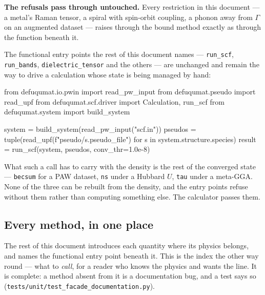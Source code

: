 \documentclass[11pt,a4paper]{article}
\newcommand{\code}[1]{\texttt{\small #1}}
\begin{document}
\textbf{The refusals pass through untouched.} Every restriction in this document
--- a metal's Raman tensor, a spiral with spin-orbit coupling, a phonon away from
$\Gamma$ on an augmented dataset --- raises through the bound method exactly as
through the function beneath it.

The functional entry points the rest of this document names --- \code{run\_scf},
\code{run\_bands}, \code{dielectric\_tensor} and the others --- are unchanged and
remain the way to drive a calculation whose state is being managed by hand:

\begin{pycode}
from defuqumat.io.pwin import read_pw_input
from defuqumat.pseudo import read_upf
from defuqumat.scf.driver import Calculation, run_scf
from defuqumat.system import build_system

system = build_system(read_pw_input("scf.in"))
pseudos = tuple(read_upf(f"pseudo/{s.pseudo_file}") for s in system.structure.species)
result = run_scf(system, pseudos, conv_thr=1.0e-8)
\end{pycode}

What such a call has to carry with the density is the rest of the converged
state --- \code{becsum} for a PAW dataset, \code{ns} under a Hubbard $U$,
\code{tau} under a meta-GGA. None of the three can be rebuilt from the density,
and the entry points refuse without them rather than computing something else.
The calculator passes them.

\subsection*{Every method, in one place}

The rest of this document introduces each quantity where its physics belongs,
and names the functional entry point beneath it. This is the index the other way
round --- what to \emph{call}, for a reader who knows the physics and wants the
line. It is complete: a method absent from it is a documentation bug, and a test
says so (\code{tests/unit/test\_facade\_documentation.py}).
\end{document}
